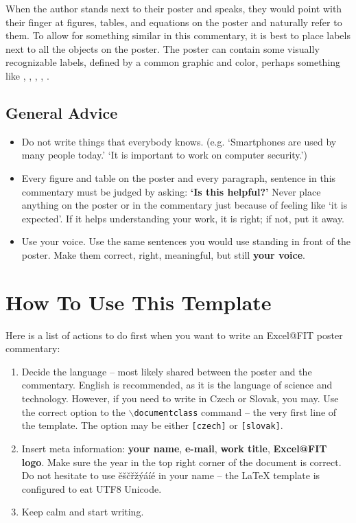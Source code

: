 \documentclass[czech]{ExcelAtFIT} %
\begin{document}
When the author stands next to their poster and speaks, they would point with their finger at figures, tables, and equations on the poster and naturally refer to them.  To allow for something similar in this commentary, it is best to place labels next to all the objects on the poster.  The poster can contain some visually recognizable labels, defined by a common graphic and color, perhaps something like , , , , .


\subsection{General Advice}

\begin{itemize}
    \item Do not write things that everybody knows.  (e.g. `Smartphones are used by many people today.' `It is important to work on computer security.')
    \item Every figure and table on the poster and every paragraph, sentence in this commentary must be judged by asking: \textbf{`Is this helpful?'}  Never place anything on the poster or in the commentary just because of feeling like `it is expected'.  If it helps understanding your work, it is right; if not, put it away.
    \item Use your voice.  Use the same sentences you would use standing in front of the poster.  Make them correct, right, meaningful, but still \textbf{your voice}.
\end{itemize}

\section{How To Use This Template}
\label{sec:HowToUse}

Here is a list of actions to do first when you want to write an Excel@FIT poster commentary:
\begin{enumerate}
	\item Decide the language -- most likely shared between the poster and the commentary.  English is recommended, as it is the language of science and technology.  However, if you need to write in Czech or Slovak, you may.  Use the correct option to the \texttt{$\backslash$documentclass} command -- the very first line of the template.  The option may be either \texttt{[czech]} or \texttt{[slovak]}.
	\item Insert meta information: \textbf{your name}, \textbf{e-mail}, \textbf{work title}, \textbf{Excel@FIT logo}.  Make sure the year in the top right corner of the document is correct.  Do not hesitate to use ěščřžýáíé in your name -- the \LaTeX{} template is configured to eat UTF8 Unicode.
	\item Keep calm and start writing.
\end{enumerate}
\end{document}
